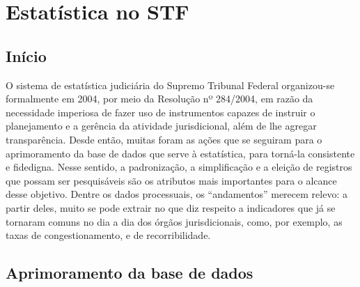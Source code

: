 \documentclass[
]{book}
\begin{document}
\hypertarget{estatuxedstica-no-stf}{%
\section{Estatística no STF}\label{estatuxedstica-no-stf}}

\hypertarget{inuxedcio}{%
\subsection{Início}\label{inuxedcio}}

O sistema de estatística judiciária do Supremo Tribunal Federal organizou-se formalmente em 2004, por meio da Resolução nº 284/2004, em razão da necessidade imperiosa de fazer uso de instrumentos capazes de instruir o planejamento e a gerência da atividade jurisdicional, além de lhe agregar transparência.
Desde então, muitas foram as ações que se seguiram para o aprimoramento da base de dados que serve à estatística, para torná-la consistente e fidedigna. Nesse sentido, a padronização, a simplificação e a eleição de registros que possam ser pesquisáveis são os atributos mais importantes para o alcance desse objetivo.
Dentre os dados processuais, os ``andamentos'' merecem relevo: a partir deles, muito se pode extrair no que diz respeito a indicadores que já se tornaram comuns no dia a dia dos órgãos jurisdicionais, como, por exemplo, as taxas de congestionamento, e de recorribilidade.

\hypertarget{aprimoramento-da-base-de-dados}{%
\subsection{Aprimoramento da base de dados}\label{aprimoramento-da-base-de-dados}}
\end{document}
